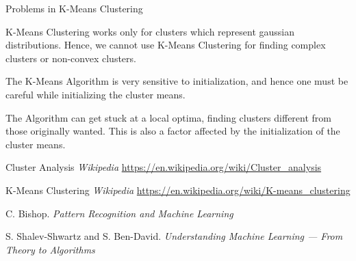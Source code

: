 \documentclass{article}
\begin{document}
\begin{ssection}{Problems in K-Means Clustering}

    K-Means Clustering works only for clusters which represent gaussian distributions. Hence, we cannot use K-Means Clustering for finding complex clusters or non-convex clusters. \br%

    The K-Means Algorithm is very sensitive to initialization, and hence one must be careful while initializing the cluster means. \br%

    The Algorithm can get stuck at a local optima, finding clusters different from those originally wanted. This is also a factor affected by the initialization of the cluster means.
    
\end{ssection}

\begin{thebibliography}{9}
    Cluster Analysis
    \textit{Wikipedia} 
    \url{https://en.wikipedia.org/wiki/Cluster\_analysis}

    K-Means Clustering
    \textit{Wikipedia} 
    \url{https://en.wikipedia.org/wiki/K-means\_clustering}

    C. Bishop.
    \textit{Pattern Recognition and Machine Learning}

    S. Shalev-Shwartz and S. Ben-David.
    \textit{Understanding Machine Learning --- From Theory to Algorithms}
\end{thebibliography}
\end{document}
